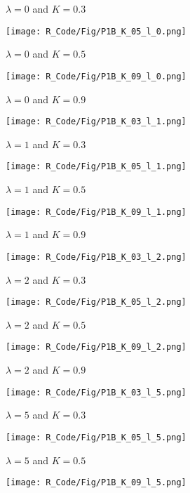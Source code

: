 \documentclass[11 pt]{article}
\begin{document}
\begin{enumerate}[label=(\Alph*)]
\begin{enumerate}[label=\arabic*.]
\begin{figure}[H]
\begin{center}
\begin{subfigure}[h]{0.3\linewidth}
				\caption{$\lambda=0$ and $K=0.3$}
			\end{subfigure}
			\begin{subfigure}[h]{0.3\linewidth}
				\texttt{[image: R\_Code/Fig/P1B\_K\_05\_l\_0.png]}
				\caption{$\lambda=0$ and $K=0.5$}
			\end{subfigure}
			\begin{subfigure}[h]{0.3\linewidth}
				\texttt{[image: R\_Code/Fig/P1B\_K\_09\_l\_0.png]}
				\caption{$\lambda=0$ and $K=0.9$}
			\end{subfigure}
			\begin{subfigure}[h]{0.3\linewidth}
				\texttt{[image: R\_Code/Fig/P1B\_K\_03\_l\_1.png]}
				\caption{$\lambda=1$ and $K=0.3$}
			\end{subfigure}
			\begin{subfigure}[h]{0.3\linewidth}
				\texttt{[image: R\_Code/Fig/P1B\_K\_05\_l\_1.png]}
				\caption{$\lambda=1$ and $K=0.5$}
			\end{subfigure}
			\begin{subfigure}[h]{0.3\linewidth}
				\texttt{[image: R\_Code/Fig/P1B\_K\_09\_l\_1.png]}
				\caption{$\lambda=1$ and $K=0.9$}
			\end{subfigure}
			\begin{subfigure}[h]{0.3\linewidth}
			\texttt{[image: R\_Code/Fig/P1B\_K\_03\_l\_2.png]}
			\caption{$\lambda=2$ and $K=0.3$}
		\end{subfigure}
		\begin{subfigure}[h]{0.3\linewidth}
			\texttt{[image: R\_Code/Fig/P1B\_K\_05\_l\_2.png]}
			\caption{$\lambda=2$ and $K=0.5$}
		\end{subfigure}
		\begin{subfigure}[h]{0.3\linewidth}
			\texttt{[image: R\_Code/Fig/P1B\_K\_09\_l\_2.png]}
			\caption{$\lambda=2$ and $K=0.9$}
		\end{subfigure}
		\begin{subfigure}[h]{0.3\linewidth}
			\texttt{[image: R\_Code/Fig/P1B\_K\_03\_l\_5.png]}
			\caption{$\lambda=5$ and $K=0.3$}
		\end{subfigure}
		\begin{subfigure}[h]{0.3\linewidth}
			\texttt{[image: R\_Code/Fig/P1B\_K\_05\_l\_5.png]}
			\caption{$\lambda=5$ and $K=0.5$}
		\end{subfigure}
		\begin{subfigure}[h]{0.3\linewidth}
			\texttt{[image: R\_Code/Fig/P1B\_K\_09\_l\_5.png]}

\end{subfigure}
\end{center}
\end{figure}
\end{enumerate}
\end{enumerate}
\end{document}
